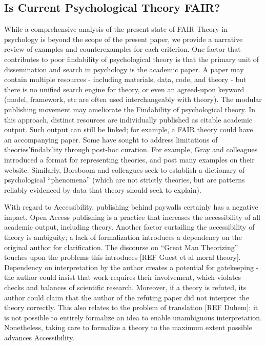 \documentclass[
  man]{apa6}
\newenvironment{lltable}{\begin{landscape}\centering\begin{ThreePartTable}}{\end{ThreePartTable}\end{landscape}}
\begin{document}
\begin{lltable}
\end{lltable}

\subsection{Is Current Psychological Theory FAIR?}\label{is-current-psychological-theory-fair}

While a comprehensive analysis of the present state of FAIR Theory in psychology is beyond the scope of the present paper,
we provide a narrative review of examples and counterexamples for each criterion.
One factor that contributes to poor findability of psychological theory is that the primary unit of dissemination and search in psychology is the academic paper.
A paper may contain multiple resources - including materials, data, code, and theory - but there is no unified search engine for theory,
or even an agreed-upon keyword (model, framework, etc are often used interchangeably with theory).
The modular publishing movement may ameliorate the Findability of psychological theory.
In this approach, distinct resources are individually published as citable academic output.
Such output can still be linked; for example, a FAIR theory could have an accompanying paper.
Some have sought to address limitations of theories'findability through post-hoc curation.
For example, Gray and colleagues introduced a format for representing theories,
and post many examples on their website.
Similarly, Borsboom and colleagues seek to establish a dictionary of psychological ``phenomena'' (which are not strictly theories, but are patterns reliably evidenced by data that theory should seek to explain).

With regard to Accessibility, publishing behind paywalls certainly has a negative impact.
Open Access publishing is a practice that increases the accessibility of all academic output, including theory.
Another factor curtailing the accessibility of theory is ambiguity;
a lack of formalization introduces a dependency on the original author for clarification.
The discourse on ``Great Man Theorizing'' touches upon the problems this introduces {[}REF Guest et al moral theory{]}.
Dependency on interpretation by the author creates a potential for gatekeeping - the author could insist that work requires their involvement, which violates checks and balances of scientific research.
Moreover, if a theory is refuted, its author could claim that the author of the refuting paper did not interpret the theory correctly.
This also relates to the problem of translation {[}REF Duhem{]}:
it is not possible to entirely formalize an idea to enable unambiguous interpretation.
Nonetheless, taking care to formalize a theory to the maximum extent possible advances Accessibility.
\end{document}

